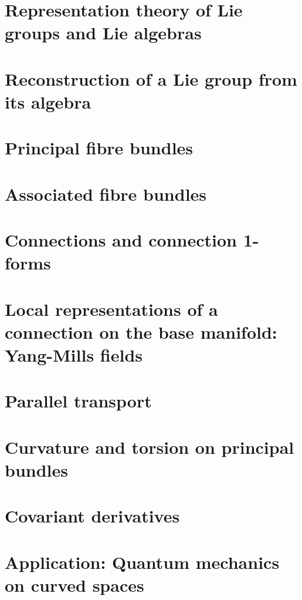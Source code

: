 \documentclass[a4paper,11pt]{article}
\theoremstyle{definition} %
\theoremstyle{plain} %
\theoremstyle{remark} %
\begin{document}
 \section{Representation theory of Lie groups and Lie algebras}
 
 \newpage

 \section{Reconstruction of a Lie group from its algebra}
 
 \newpage

 \section{Principal fibre bundles}
 
 \newpage

 \section{Associated fibre bundles}
 
 \newpage

 \section{Connections and connection 1-forms}
 
 \newpage

 \section{Local representations of a connection on the base manifold: Yang-Mills fields}
 
 \newpage

 \section{Parallel transport}
 
 \newpage

 \section{Curvature and torsion on principal bundles}
 
 \newpage

 \section{Covariant derivatives}
 
 \newpage

 \setcounter{section}{25}
 \section{Application: Quantum mechanics on curved spaces}
 
 \newpage
\end{document}
